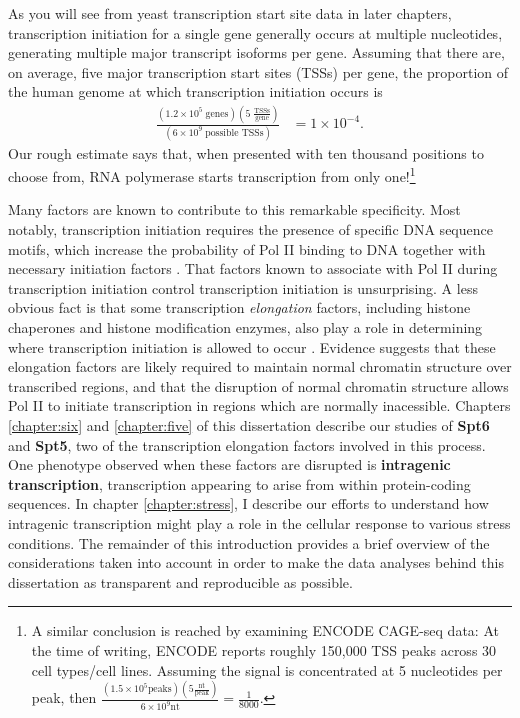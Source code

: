 As you will see from yeast transcription start site data in later chapters, transcription initiation for a single gene generally occurs at multiple nucleotides, generating multiple major transcript isoforms per gene.
Assuming that there are, on average, five major transcription start sites (TSSs) per gene, the proportion of the human genome at which transcription initiation occurs is
\begin{align*}
    \frac{\left(1.2 \times 10^5 \; \text{genes}\right) \left(5 \; \frac{\text{TSSs}}{\text{gene}} \right)}
         {\left(6 \times 10^9 \; \text{possible TSSs} \right)}
    &= 1 \times 10^{-4}.
\end{align*}
Our rough estimate says that, when presented with ten thousand positions to choose from, RNA polymerase starts transcription from only one!\footnote{A similar conclusion is reached by examining ENCODE CAGE-seq data: At the time of writing, ENCODE reports roughly 150,000 TSS peaks across 30 cell types/cell lines. Assuming the signal is concentrated at 5 nucleotides per peak, then $\frac{\left(1.5 \times 10^5 \text{peaks} \right) \left(5 \frac{\text{nt}}{\text{peak}} \right)}{6 \times 10^9 \text{nt}} = \frac{1}{8000}$.}

Many factors are known to contribute to this remarkable specificity.
Most notably, transcription initiation requires the presence of specific DNA sequence motifs, which increase the probability of Pol II binding to DNA together with necessary initiation factors \citep{haberle2018}.
That factors known to associate with Pol II during transcription initiation control transcription initiation is unsurprising.
A less obvious fact is that some transcription \textit{elongation} factors, including histone chaperones and histone modification enzymes, also play a role in determining where transcription initiation is allowed to occur \citep{kaplan2003, cheung2008, hennig2013}.
Evidence suggests that these elongation factors are likely required to maintain normal chromatin structure over transcribed regions, and that the disruption of normal chromatin structure allows Pol II to initiate transcription in regions which are normally inacessible.
Chapters \ref{chapter:six} and \ref{chapter:five} of this dissertation describe our studies of \textbf{Spt6} and \textbf{Spt5}, two of the transcription elongation factors involved in this process.
One phenotype observed when these factors are disrupted is \textbf{intragenic transcription}, transcription appearing to arise from within protein-coding sequences.
In chapter \ref{chapter:stress}, I describe our efforts to understand how intragenic transcription might play a role in the cellular response to various stress conditions.
The remainder of this introduction provides a brief overview of the considerations taken into account in order to make the data analyses behind this dissertation as transparent and reproducible as possible.

